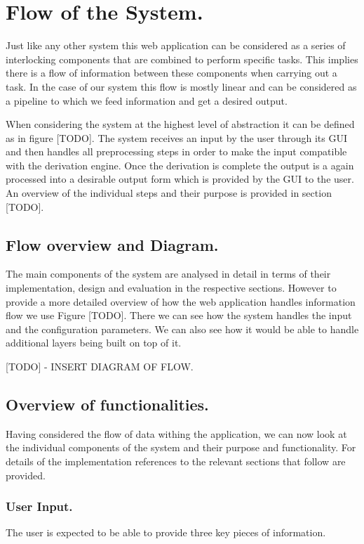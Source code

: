 \section{Flow of the System.}
Just like any other system this web application can be considered as a series of interlocking components that are combined to perform specific tasks. This implies there is a flow of information between these components when carrying out a task. In the case of our system this flow is mostly linear and can be considered as a pipeline to which we feed information and get a desired output.

When considering the system at the highest level of abstraction it can be defined as in figure [TODO]. The system receives an input by the user through its GUI and then handles all preprocessing steps in order to make the input compatible with the derivation engine. Once the derivation is complete the output is a again processed into a desirable output form which is provided by the GUI to the user. An overview of the individual steps and their purpose is provided in section [TODO].

\subsection{Flow overview and Diagram.}
The main components of the system are analysed in detail in terms of their implementation, design and evaluation in the respective sections. However to provide a more detailed overview of how the web application handles information flow we use Figure [TODO]. There we can see how the system handles the input and the configuration parameters. We can also see how it would be able to handle additional layers being built on top of it.

[TODO] - INSERT DIAGRAM OF FLOW.

\subsection{Overview of functionalities.}
Having considered the flow of data withing the application, we can now look at the individual components of the system and their purpose and functionality. For details of the implementation references to the relevant sections that follow are provided.

\subsubsection{User Input.}
The user is expected to be able to provide three key pieces of information.

